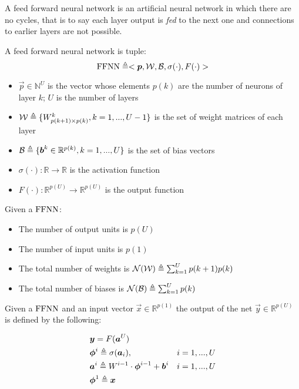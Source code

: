
A feed forward neural network is an artificial neural network in which there are no cycles, that is to say each layer output is \textit{fed} to the 
next one and connections to earlier layers are not possible. 


\begin{defn}
\label{def_ffnn}
A feed forward neural network is tuple:
$$\mathrm{FFNN}\triangleq<\boldsymbol{p},\mathcal{W},\mathcal{B},\sigma(\cdot),F(\cdot)>$$
\begin{itemize}
 \item $\vec{p} \in \mathbb{N}^U$ is the vector whose elements $p(k)$ are the number of neurons of layer $k$; $U$ is the number of layers
 \item $\mathcal{W} \triangleq \{W^k_{p(k+1) \times p(k)}, k=1,...,U-1 \}$ is the set of weight matrices of each layer
 \item $\mathcal{B} \triangleq \{\boldsymbol{b}^k \in \mathbb{R}^{p(k)}, k=1,...,U \} $ is the set of bias vectors
 \item $\sigma(\cdot): \mathbb{R}\rightarrow \mathbb{R}$ is the activation function
 \item $F(\cdot): \mathbb{R}^{p(U)}\rightarrow \mathbb{R}^{p(U)}$ is the output function
\end{itemize}
\end{defn}

\begin{remark}{}
Given a $\mathrm{FFNN}$:
\begin{itemize}
 \item The number of output units is $p(U)$
 \item The number of input units is $p(1)$
 \item The total number of weights is $\mathcal{N}(\mathcal{W}) \triangleq \sum_{k=1}^U p(k+1)p(k)$
 \item The total number of biases is $\mathcal{N}(\mathcal{B}) \triangleq \sum_{k=1}^{U} p(k)$
\end{itemize}
\end{remark}

\begin{defn}
Given a $\mathrm{FFNN}$ and an input vector $\vec{x} \in \mathbb{R}^{p(1)}$ the output of the net $\vec{y} \in \mathbb{R}^{p(U)}$  is defined by the following:

\begin{align}
&\boldsymbol{y}=F(\boldsymbol{a}^{U}) &\\
&\boldsymbol{\phi}^{i} \triangleq \sigma(\boldsymbol{a}_{i}), & i=1,...,U\\
&\boldsymbol{a}^{i} \triangleq W^{i-1} \cdot \boldsymbol{\phi}^{i-1} +\boldsymbol{b}^i  & i=1,...,U\\
&\boldsymbol{\phi}^{1} \triangleq \boldsymbol{x} &
\end{align}
\end{defn}


